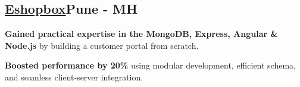 \subsection{{\large \href{https://www.eshopbox.com/}{\textbf{Eshopbox}}\hfill \normalsize Pune - MH}}
\begin{zitemize}

\item \textbf{Gained practical expertise in the MongoDB, Express, Angular \& Node.js} by building a customer portal from scratch.

\item \textbf{Boosted performance by 20\%} using modular development, efficient schema, and seamless client-server integration.

\end{zitemize}